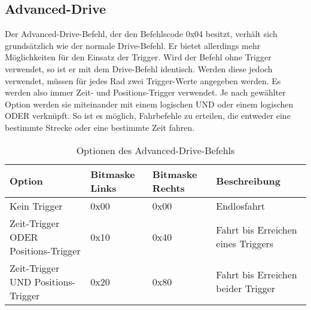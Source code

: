 \subsection{Advanced-Drive}
Der Advanced-Drive-Befehl, der den Befehlscode 0x04 besitzt, verhält sich grundsätzlich
wie der normale Drive-Befehl. Er bietet allerdings mehr Möglichkeiten für den Einsatz der Trigger.
Wird der Befehl ohne Trigger
verwendet, so ist er mit dem Drive-Befehl identisch. Werden diese jedoch verwendet,
müssen für jedes Rad zwei Trigger-Werte angegeben werden. Es werden also immer Zeit-
und Positions-Trigger verwendet. Je nach gewählter Option werden sie miteinander mit einem logischen
UND oder einem logischen ODER verknüpft. So ist es möglich, Fahrbefehle
zu erteilen, die entweder eine bestimmte Strecke oder eine bestimmte Zeit fahren.
\begin{table}[htb]
\begin{center}
	\begin{tabularx}{\linewidth}{|X|l|l|X|}
		\hline
		\textbf{Option} & \textbf{Bitmaske Links} & \textbf{Bitmaske Rechts} & \textbf{Beschreibung} \\
		\hline
		\hline
		Kein Trigger				& 0x00						   & 0x00						   & Endlosfahrt \\
		\hline
		Zeit-Trigger ODER Positions-Trigger	& 0x10						   & 0x40						   & Fahrt bis Erreichen eines Triggers\\
		\hline
		Zeit-Trigger UND Positions-Trigger  & 0x20						   & 0x80						   & Fahrt bis Erreichen beider Trigger\\
		\hline
	\end{tabularx}
	\caption{\label{protocol_advanced_drive} Optionen des Advanced-Drive-Befehls}
\end{center}
\end{table}

